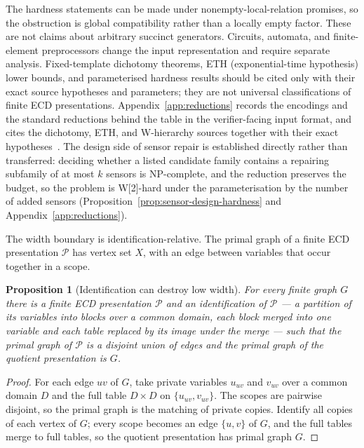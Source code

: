 \documentclass[11pt]{article}
\theoremstyle{plain}
\newtheorem{proposition}[theorem]{Proposition}
\theoremstyle{definition}
\theoremstyle{remark}
\begin{document}
The hardness statements can be made under nonempty-local-relation promises, so
the obstruction is global compatibility rather than a locally empty factor.
These are not claims about arbitrary succinct generators.  Circuits, automata,
and finite-element preprocessors change the input representation and require
separate analysis.  Fixed-template dichotomy theorems, ETH (exponential-time
hypothesis) lower bounds, and parameterised hardness results should be cited only with their exact source
hypotheses and parameters; they are not universal classifications of finite ECD
presentations.  Appendix~\ref{app:reductions} records the encodings and the
standard reductions behind the table in the verifier-facing input format, and
cites the dichotomy, ETH, and W-hierarchy sources together with their exact
hypotheses~\cite{schaefer78,zhuk17,impagliazzo-paturi01,downey-fellows99}.
The design side of sensor repair is established directly rather than
transferred: deciding whether a listed candidate family contains a repairing
subfamily of at most \(k\) sensors is NP-complete, and the reduction
preserves the budget, so the problem is W[2]-hard under the parameterisation
by the number of added sensors (Proposition~\ref{prop:sensor-design-hardness}
and Appendix~\ref{app:reductions}).

The width boundary is identification-relative.  The primal graph of a finite
ECD presentation \(\mathcal P\) has vertex set \(X\), with an edge between
variables that occur together in a scope.

\begin{proposition}[Identification can destroy low width]
\label{prop:identification-width}
For every finite graph \(G\) there is a finite ECD presentation \(\mathcal P\)
and an identification of \(\mathcal P\) --- a partition of its variables into
blocks over a common domain, each block merged into one variable and each
table replaced by its image under the merge --- such that the primal graph of
\(\mathcal P\) is a disjoint union of edges and the primal graph of the
quotient presentation is \(G\).
\end{proposition}

\begin{proof}
For each edge \(uv\) of \(G\), take private variables \(u_{uv}\) and
\(v_{uv}\) over a common domain \(D\) and the full table \(D\times D\) on
\(\{u_{uv},v_{uv}\}\).  The scopes are pairwise disjoint, so the primal
graph is the matching of private copies.  Identify all copies of each vertex
of \(G\); every scope becomes an edge \(\{u,v\}\) of \(G\), and the full
tables merge to full tables, so the quotient presentation has primal graph
\(G\).
\end{proof}
\end{document}
